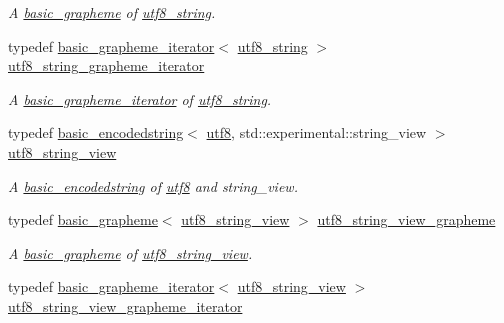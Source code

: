 \begin{DoxyCompactItemize}
\begin{DoxyCompactList}\small\item\em A \hyperlink{classu5e_1_1basic__grapheme}{basic\+\_\+grapheme} of \hyperlink{classu5e_1_1utf8__string}{utf8\+\_\+string}. \end{DoxyCompactList}\item 
typedef \hyperlink{classu5e_1_1basic__grapheme__iterator}{basic\+\_\+grapheme\+\_\+iterator}$<$ \hyperlink{classu5e_1_1utf8__string}{utf8\+\_\+string} $>$ \hyperlink{namespaceu5e_a74a084fc31e6af27114007a21f6f89e7}{utf8\+\_\+string\+\_\+grapheme\+\_\+iterator}\hypertarget{namespaceu5e_a74a084fc31e6af27114007a21f6f89e7}{}\label{namespaceu5e_a74a084fc31e6af27114007a21f6f89e7}

\begin{DoxyCompactList}\small\item\em A \hyperlink{classu5e_1_1basic__grapheme__iterator}{basic\+\_\+grapheme\+\_\+iterator} of \hyperlink{classu5e_1_1utf8__string}{utf8\+\_\+string}. \end{DoxyCompactList}\item 
typedef \hyperlink{classu5e_1_1basic__encodedstring}{basic\+\_\+encodedstring}$<$ \hyperlink{classu5e_1_1utf8}{utf8}, std\+::experimental\+::string\+\_\+view $>$ \hyperlink{namespaceu5e_af5abb9026a8b93e2aadd01ee514208d3}{utf8\+\_\+string\+\_\+view}\hypertarget{namespaceu5e_af5abb9026a8b93e2aadd01ee514208d3}{}\label{namespaceu5e_af5abb9026a8b93e2aadd01ee514208d3}

\begin{DoxyCompactList}\small\item\em A \hyperlink{classu5e_1_1basic__encodedstring}{basic\+\_\+encodedstring} of \hyperlink{classu5e_1_1utf8}{utf8} and string\+\_\+view. \end{DoxyCompactList}\item 
typedef \hyperlink{classu5e_1_1basic__grapheme}{basic\+\_\+grapheme}$<$ \hyperlink{classu5e_1_1utf8__string__view}{utf8\+\_\+string\+\_\+view} $>$ \hyperlink{namespaceu5e_a3255333e6ec6b7d9fd55a3937b445a9e}{utf8\+\_\+string\+\_\+view\+\_\+grapheme}\hypertarget{namespaceu5e_a3255333e6ec6b7d9fd55a3937b445a9e}{}\label{namespaceu5e_a3255333e6ec6b7d9fd55a3937b445a9e}

\begin{DoxyCompactList}\small\item\em A \hyperlink{classu5e_1_1basic__grapheme}{basic\+\_\+grapheme} of \hyperlink{classu5e_1_1utf8__string__view}{utf8\+\_\+string\+\_\+view}. \end{DoxyCompactList}\item 
typedef \hyperlink{classu5e_1_1basic__grapheme__iterator}{basic\+\_\+grapheme\+\_\+iterator}$<$ \hyperlink{classu5e_1_1utf8__string__view}{utf8\+\_\+string\+\_\+view} $>$ \hyperlink{namespaceu5e_a3e36b87941b75a409fff1cae69b5bdb0}{utf8\+\_\+string\+\_\+view\+\_\+grapheme\+\_\+iterator}\hypertarget{namespaceu5e_a3e36b87941b75a409fff1cae69b5bdb0}{}\label{namespaceu5e_a3e36b87941b75a409fff1cae69b5bdb0}


\end{DoxyCompactItemize}
